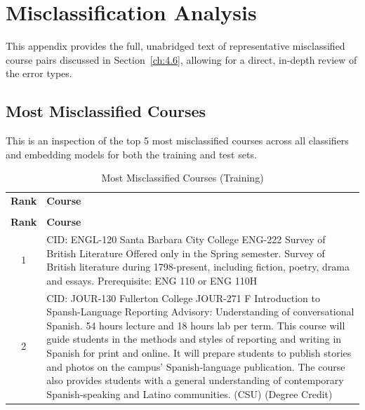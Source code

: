\chapter{Misclassification Analysis}
This appendix provides the full, unabridged text of representative misclassified course pairs discussed in Section~\ref{ch:4.6}, allowing for a direct, in-depth review of the error types.

\section{Most Misclassified Courses}\label{app:mostmiscls}
This is an inspection of the top 5 most misclassified courses across all classifiers and embedding models for both the training and test sets.

{
\renewcommand{\arraystretch}{0.5}    
\begin{longtable}{ >{\baselineskip=12pt}c >{\baselineskip=12pt}p{} }
\captionsetup{skip=5pt}
\caption{Most Misclassified Courses (Training)}\label{tab:fp_overlap_training}\\
\toprule
\textbf{\textbf{Rank}} & \textbf{\textbf{Course}} \\
\midrule
\endfirsthead
\caption[]{Most Misclassified Courses (Training)}\\
\toprule
\textbf{\textbf{Rank}} & \textbf{\textbf{Course}} \\
\midrule
\endhead
1 & CID: ENGL-120 \newline
Santa Barbara City College \newline
ENG-222 Survey of British Literature \newline
Offered only in the Spring semester. Survey of British literature during 1798-present, including fiction, poetry, drama and essays. Prerequisite: ENG 110 or ENG 110H\\
\midrule
2 & CID: JOUR-130 \newline
Fullerton College \newline
JOUR-271 F Introduction to Spansh-Language Reporting \newline
Advisory: Understanding of conversational Spanish. 54 hours lecture and 18 hours lab per term. This course will guide students in the methods and styles of reporting and writing in Spanish for print and online. It will prepare students to publish stories and photos on the campus' Spanish-language publication. The course also provides students with a general understanding of contemporary Spanish-speaking and Latino communities. (CSU) (Degree Credit)\\

\end{longtable}}
